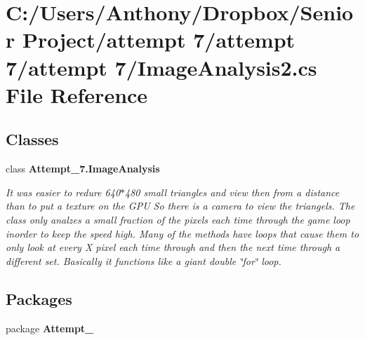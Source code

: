 \section{C:/Users/Anthony/Dropbox/Senior Project/attempt 7/attempt 7/attempt 7/ImageAnalysis2.cs File Reference}
\label{_image_analysis2_8cs}
\subsection*{Classes}
\begin{DoxyCompactItemize}
\item 
class {\bf Attempt\_\-7.ImageAnalysis}
\begin{DoxyCompactList}\small\item\em It was easier to redure 640$\ast$480 small triangles and view then from a distance than to put a texture on the GPU So there is a camera to view the triangels. The class only analzes a small fraction of the pixels each time through the game loop inorder to keep the speed high. Many of the methods have loops that cause them to only look at every X pixel each time through and then the next time through a different set. Basically it functions like a giant double \char`\"{}for\char`\"{} loop. \item\end{DoxyCompactList}\end{DoxyCompactItemize}
\subsection*{Packages}
\begin{DoxyCompactItemize}
\item 
package {\bf Attempt\_}
\end{DoxyCompactItemize}
